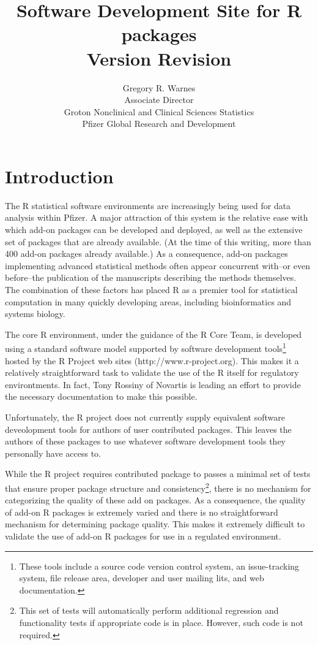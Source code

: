 \documentclass[12pt]{article}
\title{Software Development Site for R packages\\
       Version $ $Revision$ $ }
\author{Gregory R. Warnes\\
  Associate Director\\
  Groton Nonclinical and Clinical Sciences Statistics\\
  Pfizer Global Research and Development}
\begin{document}
\maketitle

\section{Introduction}

The R statistical software environments are increasingly being used
for data analysis within Pfizer.  A major attraction of this system is
the relative ease with which add-on packages can be developed and
deployed, as well as the extensive set of packages that are already
available.  (At the time of this writing, more than 400 add-on
packages already available.)  As a consequence, add-on packages
implementing advanced statistical methods often appear concurrent
with--or even before--the publication of the manuscripts describing
the methods themselves.  The combination of these factors has placed R
as a premier tool for statistical computation in many quickly
developing areas, including bioinformatics and systems biology.

The core R environment, under the guidance of the R Core Team, is
developed using a standard software model supported by software
development tools\footnote{These tools include a source code version
  control system, an issue-tracking system, file release area,
  developer and user mailing lits, and web documentation.}  hosted by
the R Project web sites (http://www.r-project.org).  This makes it a
relatively straightforward task to validate the use of the R itself
for regulatory environtments.  In fact, Tony Rossiny of Novartis is
leading an effort to provide the necessary documentation to make this
possible.

Unfortunately, the R project does not currently supply equivalent
software deveolopment tools for authors of user contributed packages.
This leaves the authors of these packages to use whatever software
development tools they personally have access to.  

While the R project requires contributed package to passes a minimal
set of tests that ensure proper package structure and
consistency\footnote{This set of tests will automatically perform
  additional regression and functionality tests if appropriate code is
  in place.  However, such code is not required.}, there is no
mechanism for categorizing the quality of these add on packages.  As a
consequence, the quality of add-on R packages is extremely varied and
there is no straightforward mechanism for determining package quality.
This makes it extremely difficult to validate the use of add-on R
packages for use in a regulated environment.
\end{document}
